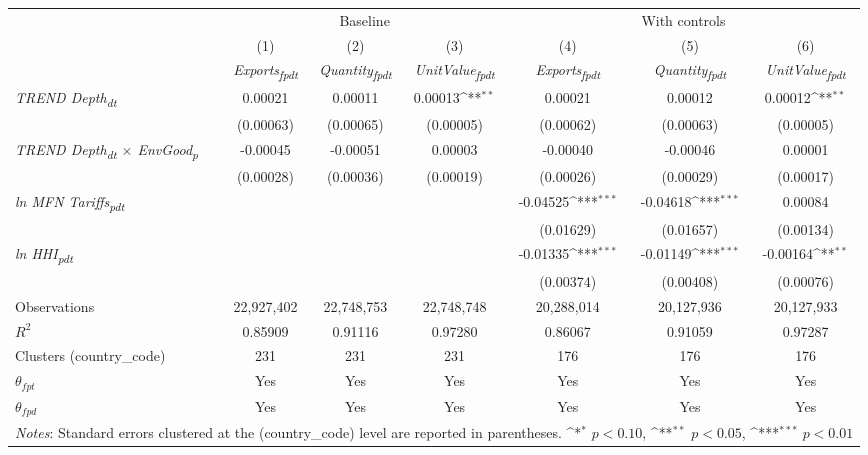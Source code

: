 {
\def\sym#1{\ifmmode^{#1}\else\(^{#1}\)\fi}
\begin{tabular}{l*{6}{c}}
\toprule
&\multicolumn{3}{c}{Baseline}&\multicolumn{3}{c}{With controls}\\\cmidrule(lr){2-4}\cmidrule(lr){5-7}
&(1)&(2)&(3)&(4)&(5)&(6)\\
&\textit{Exports\textsubscript{fpdt}}&\textit{Quantity\textsubscript{fpdt}}&\textit{UnitValue\textsubscript{fpdt}}&\textit{Exports\textsubscript{fpdt}}&\textit{Quantity\textsubscript{fpdt}}&\textit{UnitValue\textsubscript{fpdt}}\\
\midrule
\textit{TREND Depth\textsubscript{dt}} & 0.00021 & 0.00011 & 0.00013\sym{**} & 0.00021 & 0.00012 & 0.00012\sym{**}\\
 & (0.00063) & (0.00065) & (0.00005) & (0.00062) & (0.00063) & (0.00005)\\
\addlinespace
\textit{TREND Depth\textsubscript{dt} $\times$ EnvGood\textsubscript{p}} & -0.00045 & -0.00051 & 0.00003 & -0.00040 & -0.00046 & 0.00001\\
 & (0.00028) & (0.00036) & (0.00019) & (0.00026) & (0.00029) & (0.00017)\\
\addlinespace
\textit{ln MFN Tariffs\textsubscript{pdt}} &  &  &  & -0.04525\sym{***} & -0.04618\sym{***} & 0.00084\\
 &  &  &  & (0.01629) & (0.01657) & (0.00134)\\
\addlinespace
\textit{ln HHI\textsubscript{pdt}} &  &  &  & -0.01335\sym{***} & -0.01149\sym{***} & -0.00164\sym{**}\\
 &  &  &  & (0.00374) & (0.00408) & (0.00076)\\
\midrule
Observations & 22,927,402 & 22,748,753 & 22,748,748 & 20,288,014 & 20,127,936 & 20,127,933\\
$R^{2}$ & 0.85909 & 0.91116 & 0.97280 & 0.86067 & 0.91059 & 0.97287\\
Clusters (country_code) & 231 & 231 & 231 & 176 & 176 & 176\\
$\theta_{fpt}$ & Yes & Yes & Yes & Yes & Yes & Yes\\
$\theta_{fpd}$ & Yes & Yes & Yes & Yes & Yes & Yes\\
\bottomrule
\multicolumn{7}{l}{\footnotesize \textit{Notes}: Standard errors clustered at the (country_code) level are reported in parentheses. \sym{*} \(p<0.10\), \sym{**} \(p<0.05\), \sym{***} \(p<0.01\)}\\
\end{tabular}
}
